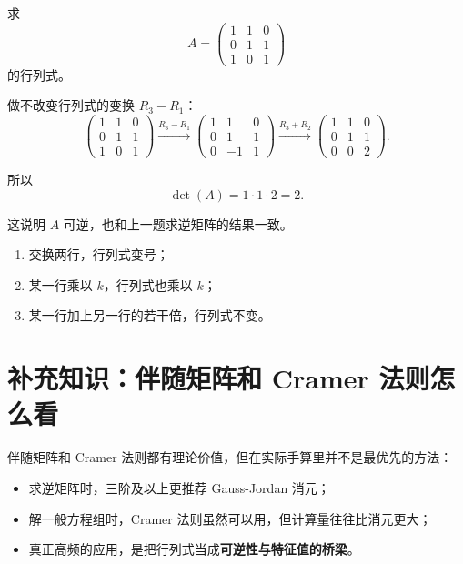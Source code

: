 \documentclass[11pt,oneside,UTF8]{ctexbook}
\newcommand{\important}[1]{\textcolor{Sakura}{\textbf{#1}}}
\begin{document}
\begin{examplebox}[例 5：用消元法求三阶行列式]
求
\[
A=
\begin{pmatrix}
1&1&0\\
0&1&1\\
1&0&1
\end{pmatrix}
\]
的行列式。

做不改变行列式的变换 \(R_3-R_1\)：
\[
\begin{pmatrix}
1&1&0\\
0&1&1\\
1&0&1
\end{pmatrix}
\xrightarrow{R_3-R_1}
\begin{pmatrix}
1&1&0\\
0&1&1\\
0&-1&1
\end{pmatrix}
\xrightarrow{R_3+R_2}
\begin{pmatrix}
1&1&0\\
0&1&1\\
0&0&2
\end{pmatrix}.
\]

所以
\[
\det(A)=1\cdot 1\cdot 2=2.
\]

这说明 \(A\) 可逆，也和上一题求逆矩阵的结果一致。
\end{examplebox}

\begin{summarybox}[行列式与行变换的关系]
\begin{enumerate}
  \item 交换两行，行列式变号；
  \item 某一行乘以 \(k\)，行列式也乘以 \(k\)；
  \item 某一行加上另一行的若干倍，行列式不变。
\end{enumerate}
\end{summarybox}

\section{补充知识：伴随矩阵和 Cramer 法则怎么看}

伴随矩阵和 Cramer 法则都有理论价值，但在实际手算里并不是最优先的方法：
\begin{itemize}
  \item 求逆矩阵时，三阶及以上更推荐 Gauss-Jordan 消元；
  \item 解一般方程组时，Cramer 法则虽然可以用，但计算量往往比消元更大；
  \item 真正高频的应用，是把行列式当成\important{可逆性与特征值的桥梁}。
\end{itemize}
\end{document}
